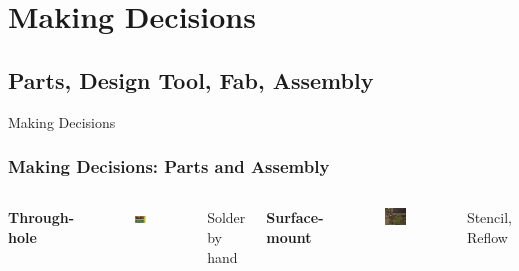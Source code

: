 \documentclass{beamer}
\begin{document}
\section{Making Decisions} 
\subsection{Parts, Design Tool, Fab, Assembly} 
\begin{frame}
\Huge{\centerline{Making Decisions}}
\end{frame}

\begin{frame}
\frametitle{Making Decisions: Parts and Assembly}
\begin{columns}[t] %

\centerline{\textbf{Through-hole}}
\begin{figure}
\includegraphics[width=0.8\linewidth]{th.jpg}
\end{figure}
\centerline{Solder by hand}

\centerline{\textbf{Surface-mount}}
\begin{figure}
\includegraphics[width=0.8\linewidth]{smt.jpg}
\end{figure}
\centerline{Stencil, Reflow}

\end{columns}
\end{frame}
\end{document}
